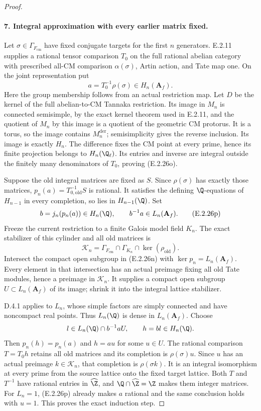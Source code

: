\begin{proof}
\paragraph{7. Integral approximation with every earlier matrix fixed.}
Let \(\sigma\in\Gamma_{F_{\mathrm{cm}}}\) have
fixed conjugate targets for the first \(n\)
generators. E.2.11 supplies a rational tensor
comparison \(T_0\) on the full rational abelian
category with prescribed all-CM comparison
\(\alpha(\sigma)\), Artin action, and Tate map
one. On the joint representation put
\[
 a=T_0^{-1}\rho(\sigma)\in H_n(\mathbf A_f).
 \tag{E.2.26o}
\]
Here the group membership follows from an actual
restriction map. Let \(D\) be the kernel of
the full abelian-to-CM Tannaka restriction.
Its image in \(M_n\) is connected semisimple,
by the exact kernel theorem used in E.2.11,
and the quotient of \(M_n\) by this image is
a quotient of the geometric CM protorus.
It is a torus, so the image contains
\(M_n^{\mathrm{der}}\); semisimplicity gives
the reverse inclusion. Its image is exactly
\(H_n\). The difference fixes the CM point
at every prime, hence its finite projection
belongs to \(H_n(\Q_\ell)\). Its entries
and inverse are integral outside the finitely
many denominators of \(T_0\), proving
(E.2.26o).

Suppose the old integral matrices are fixed as
\(S\). Since \(\rho(\sigma)\) has exactly
those matrices, \(p_n(a)=T_{0,\mathrm{old}}^{-1}S\)
is rational. It satisfies the defining
\(\Q\)-equations of \(H_{n-1}\) in every
completion, so lies in \(H_{n-1}(\Q)\).
Set
\[
 b=j_n(p_n(a))\in H_n(\Q),\qquad
 b^{-1}a\in L_n(\mathbf A_f).
 \tag{E.2.26p}
\]
Freeze the current restriction to a finite
Galois model field \(K_n\). The exact
stabilizer of this cylinder and all old
matrices is
\[
 \mathcal K_n=\Gamma_{F_{\mathrm{cm}}}
       \cap\Gamma_{K_n}\cap\ker(\rho_{\mathrm{old}}).
 \tag{E.2.26q}
\]
Intersect the compact open subgroup in
(E.2.26n) with \(\ker p_n=L_n(\mathbf A_f)\).
Every element in that intersection has an
actual preimage fixing all old Tate modules,
hence a preimage in \(\mathcal K_n\).
It supplies a compact open subgroup
\(U\subset L_n(\mathbf A_f)\) of its image;
shrink it into the integral lattice stabilizer.

D.4.1 applies to \(L_n\), whose simple factors
are simply connected and have noncompact real
points. Thus \(L_n(\Q)\) is dense in
\(L_n(\mathbf A_f)\). Choose
\[
 l\in L_n(\Q)\cap b^{-1}aU,
 \qquad h=bl\in H_n(\Q).
\]
Then \(p_n(h)=p_n(a)\) and \(h=au\)
for some \(u\in U\). The rational comparison
\(T=T_0h\) retains all old matrices and
its completion is \(\rho(\sigma)u\).
Since \(u\) has an actual preimage
\(k\in\mathcal K_n\), that completion
is \(\rho(\sigma k)\). It is an integral
isomorphism at every prime from the source
lattice onto the fixed target lattice.
Both \(T\) and \(T^{-1}\) have rational
entries in \(\widehat\Z\), and
\(\Q\cap\widehat\Z=\Z\) makes them
integer matrices. For \(L_n=1\),
(E.2.26p) already makes \(a\) rational
and the same conclusion holds with \(u=1\).
This proves the exact induction step.


\end{proof}
